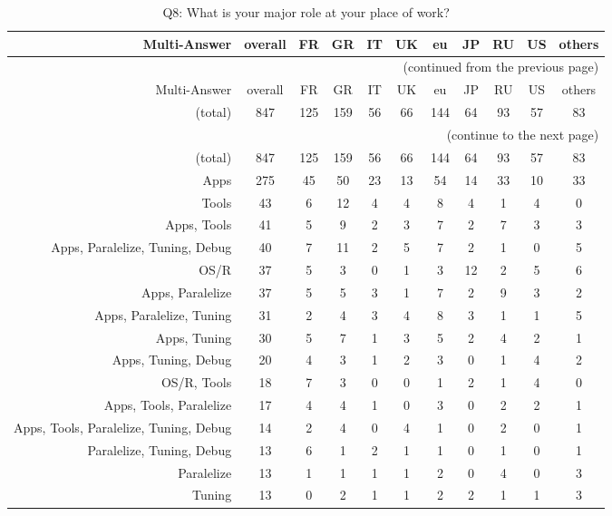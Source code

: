 \clearpage%
{\footnotesize\begin{landscape}%
\begin{longtable}[htb]{r|c|c|c|c|c|c|c|c|c|c}%
\caption{Q8: What is your major role at your place of work?}%
\label{tab:Q8-mans} \\%
\hline%
Multi-Answer & overall & FR & GR & IT & UK & eu & JP & RU & US & others \\
 \hline%
\endfirsthead%
\multicolumn{11}{r}{(continued from the previous page)}\\%
\hline%
Multi-Answer & overall & FR & GR & IT & UK & eu & JP & RU & US & others \\
 \hline%
\endhead%
\hline%
(total) & 847 & 125 & 159 & 56 & 66 & 144 & 64 & 93 & 57 & 83 \\%
\hline%
\multicolumn{11}{r}{(continue to the next page)}\\%
\endfoot%
\hline%
(total) & 847 & 125 & 159 & 56 & 66 & 144 & 64 & 93 & 57 & 83 \\%
\hline%
\endlastfoot%
\hline%
{Apps} & 275 & 45 & 50 & 23 & 13 & 54 & 14 & 33 & 10 & 33 \\%
{Tools} & 43 & 6 & 12 & 4 & 4 & 8 & 4 & 1 & 4 & 0 \\%
{Apps, Tools} & 41 & 5 & 9 & 2 & 3 & 7 & 2 & 7 & 3 & 3 \\%
{Apps, Paralelize, Tuning, Debug} & 40 & 7 & 11 & 2 & 5 & 7 & 2 & 1 & 0 & 5 \\%
{OS/R} & 37 & 5 & 3 & 0 & 1 & 3 & 12 & 2 & 5 & 6 \\%
{Apps, Paralelize} & 37 & 5 & 5 & 3 & 1 & 7 & 2 & 9 & 3 & 2 \\%
{Apps, Paralelize, Tuning} & 31 & 2 & 4 & 3 & 4 & 8 & 3 & 1 & 1 & 5 \\%
{Apps, Tuning} & 30 & 5 & 7 & 1 & 3 & 5 & 2 & 4 & 2 & 1 \\%
{Apps, Tuning, Debug} & 20 & 4 & 3 & 1 & 2 & 3 & 0 & 1 & 4 & 2 \\%
{OS/R, Tools} & 18 & 7 & 3 & 0 & 0 & 1 & 2 & 1 & 4 & 0 \\%
{Apps, Tools, Paralelize} & 17 & 4 & 4 & 1 & 0 & 3 & 0 & 2 & 2 & 1 \\%
{Apps, Tools, Paralelize, Tuning, Debug} & 14 & 2 & 4 & 0 & 4 & 1 & 0 & 2 & 0 & 1 \\%
{Paralelize, Tuning, Debug} & 13 & 6 & 1 & 2 & 1 & 1 & 0 & 1 & 0 & 1 \\%
{Paralelize} & 13 & 1 & 1 & 1 & 1 & 2 & 0 & 4 & 0 & 3 \\%
{Tuning} & 13 & 0 & 2 & 1 & 1 & 2 & 2 & 1 & 1 & 3 \\%

\end{longtable}
\end{landscape}}
